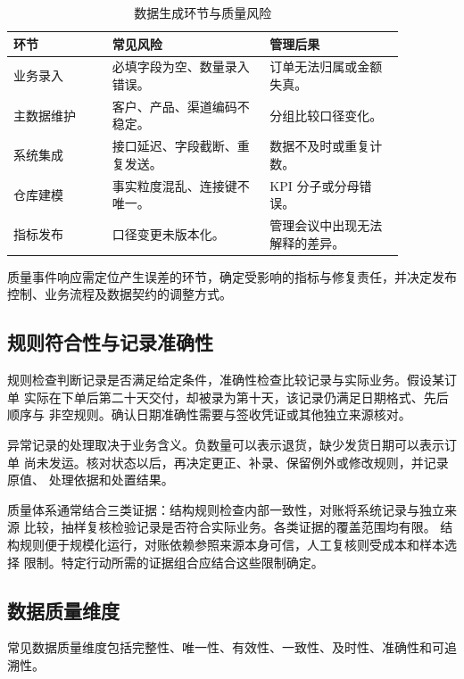 \begin{table}[htbp]
\centering
\caption{数据生成环节与质量风险}
\begin{tabular}{P{0.22\linewidth}P{0.35\linewidth}P{0.30\linewidth}}
\toprule
{}
环节 & 常见风险 & 管理后果\\
\midrule
业务录入 & 必填字段为空、数量录入错误。 & 订单无法归属或金额失真。\\
主数据维护 & 客户、产品、渠道编码不稳定。 & 分组比较口径变化。\\
系统集成 & 接口延迟、字段截断、重复发送。 & 数据不及时或重复计数。\\
仓库建模 & 事实粒度混乱、连接键不唯一。 & KPI 分子或分母错误。\\
指标发布 & 口径变更未版本化。 & 管理会议中出现无法解释的差异。\\
\bottomrule
\end{tabular}
\end{table}

\begin{remark}
质量事件响应需定位产生误差的环节，确定受影响的指标与修复责任，并决定发布控制、业务流程及数据契约的调整方式。
\end{remark}

\subsection{规则符合性与记录准确性}
规则检查判断记录是否满足给定条件，准确性检查比较记录与实际业务。假设某订单
实际在下单后第二十天交付，却被录为第十天，该记录仍满足日期格式、先后顺序与
非空规则。确认日期准确性需要与签收凭证或其他独立来源核对。

异常记录的处理取决于业务含义。负数量可以表示退货，缺少发货日期可以表示订单
尚未发运。核对状态以后，再决定更正、补录、保留例外或修改规则，并记录原值、
处理依据和处置结果。

质量体系通常结合三类证据：结构规则检查内部一致性，对账将系统记录与独立来源
比较，抽样复核检验记录是否符合实际业务。各类证据的覆盖范围均有限。
结构规则便于规模化运行，对账依赖参照来源本身可信，人工复核则受成本和样本选择
限制。特定行动所需的证据组合应结合这些限制确定。

\subsection{数据质量维度}

常见数据质量维度包括完整性、唯一性、有效性、一致性、及时性、准确性和可追溯性。


